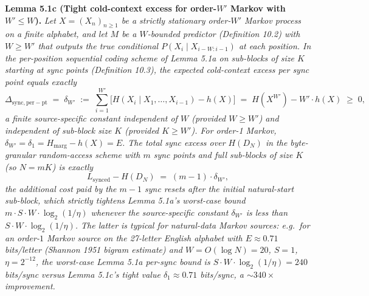 \documentclass[
]{article}
\begin{document}
\textbf{Lemma 5.1c (Tight cold-context excess for order-$W'$ Markov
with $W' \leq W$).} \emph{Let $X = (X_n)_{n \geq 1}$ be a strictly
stationary order-$W'$ Markov process on a finite alphabet, and let
$M$ be a $W$-bounded predictor (Definition 10.2) with $W \geq W'$
that outputs the true conditional $P(X_i \mid X_{i-W:i-1})$ at each
position. In the per-position sequential coding scheme of Lemma 5.1a
on sub-blocks of size $K$ starting at sync points (Definition 10.3),
the expected cold-context excess per sync point equals exactly}
\[
\Delta_{\mathrm{sync, per-pt}}
\;=\; \delta_{W'}
\;:=\; \sum_{i=1}^{W'} \bigl[ H(X_i \mid X_1, \ldots, X_{i-1}) - h(X) \bigr]
\;=\; H(X^{W'}) - W' \cdot h(X)
\;\geq\; 0,
\tag{5.9}
\]
\emph{a finite source-specific constant independent of $W$ (provided
$W \geq W'$) and independent of sub-block size $K$ (provided
$K \geq W'$). For order-1 Markov, $\delta_{W'} = \delta_1 =
H_{\mathrm{marg}} - h(X) = E$. The
total sync \emph{excess over $H(D_N)$} in the byte-granular
random-access scheme with $m$ sync points and full sub-blocks of
size $K$ (so $N = m K$) is exactly}
\[
L_{\mathrm{synced}} - H(D_N) \;=\; (m - 1) \cdot \delta_{W'},
\]
\emph{the additional cost paid by the $m-1$ sync resets after the
initial natural-start sub-block, which strictly tightens Lemma 5.1a's
worst-case bound $m \cdot S \cdot W \cdot \log_2(1/\eta)$ whenever
the source-specific constant $\delta_{W'}$ is less than
$S \cdot W \cdot \log_2(1/\eta)$. The latter is typical for
natural-data Markov sources: e.g.\ for an order-$1$ Markov source on
the 27-letter English alphabet with $E \approx 0.71$ bits/letter
(Shannon 1951 bigram estimate) and $W = O(\log N) = 20$, $S = 1$,
$\eta = 2^{-12}$, the worst-case Lemma 5.1a per-sync bound is
$S \cdot W \cdot \log_2(1/\eta) = 240$ bits/sync versus Lemma 5.1c's
tight value $\delta_1 \approx 0.71$ bits/sync, a $\sim 340\times$
improvement.}
\end{document}

